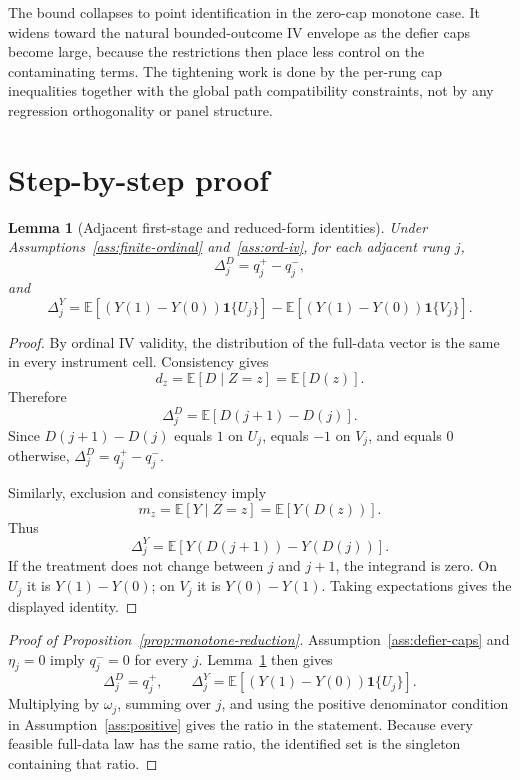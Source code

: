 \documentclass[11pt]{article}
\newcommand{\E}{\mathbb{E}}
\newcommand{\one}{\mathbf{1}}
\theoremstyle{definition}
\theoremstyle{plain}
\newtheorem{lemma}{Lemma}
\theoremstyle{remark}
\begin{document}
The bound collapses to point identification in the zero-cap monotone case.  It
widens toward the natural bounded-outcome IV envelope as the defier caps become
large, because the restrictions then place less control on the contaminating
terms.  The tightening work is done by the per-rung cap inequalities together
with the global path compatibility constraints, not by any regression
orthogonality or panel structure.

\section{Step-by-step proof}
\begin{lemma}[Adjacent first-stage and reduced-form identities]\label{lem:adjacent-identities}
Under Assumptions~\ref{ass:finite-ordinal} and~\ref{ass:ord-iv}, for each
adjacent rung \(j\),
\[
\Delta^D_j=q_j^+-q_j^-,
\]
and
\[
\Delta^Y_j
=\E[(Y(1)-Y(0))\one\{U_j\}]
-\E[(Y(1)-Y(0))\one\{V_j\}].
\]
\end{lemma}

\begin{proof}
By ordinal IV validity, the distribution of the full-data vector is the same
in every instrument cell.  Consistency gives
\[
d_z=\E[D\mid Z=z]=\E[D(z)].
\]
Therefore
\[
\Delta^D_j=\E[D(j+1)-D(j)].
\]
Since \(D(j+1)-D(j)\) equals \(1\) on \(U_j\), equals \(-1\) on \(V_j\), and
equals \(0\) otherwise, \(\Delta^D_j=q_j^+-q_j^-\).

Similarly, exclusion and consistency imply
\[
m_z=\E[Y\mid Z=z]=\E[Y(D(z))].
\]
Thus
\[
\Delta^Y_j
=\E[Y(D(j+1))-Y(D(j))].
\]
If the treatment does not change between \(j\) and \(j+1\), the integrand is
zero.  On \(U_j\) it is \(Y(1)-Y(0)\); on \(V_j\) it is
\(Y(0)-Y(1)\).  Taking expectations gives the displayed identity.
\end{proof}

\begin{proof}[Proof of Proposition~\ref{prop:monotone-reduction}]
Assumption~\ref{ass:defier-caps} and \(\eta_j=0\) imply \(q_j^-=0\) for every
\(j\).  Lemma~\ref{lem:adjacent-identities} then gives
\[
\Delta^D_j=q_j^+,\qquad
\Delta^Y_j=\E[(Y(1)-Y(0))\one\{U_j\}].
\]
Multiplying by \(\omega_j\), summing over \(j\), and using the positive
denominator condition in Assumption~\ref{ass:positive} gives the ratio in the
statement.  Because every feasible full-data law has the same ratio, the
identified set is the singleton containing that ratio.
\end{proof}
\end{document}
